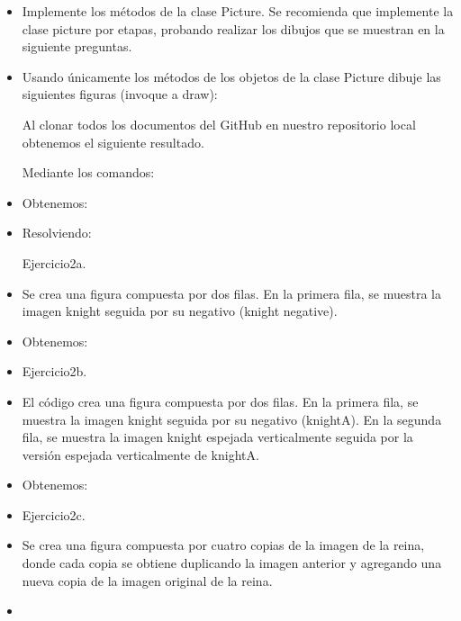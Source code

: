 \documentclass{article}
\begin{document}
\begin{itemize}
        \item Implemente los métodos de la clase Picture. Se recomienda que implemente la clase picture por etapas, probando realizar los dibujos que se muestran en la siguiente preguntas.

        \item Usando únicamente los métodos de los objetos de la clase Picture dibuje las siguientes figuras (invoque a draw):

        Al clonar todos los documentos del GitHub en nuestro repositorio local obtenemos el siguiente 
        resultado.

        Mediante los comandos:
        \item[ ]{}
        
         Obtenemos:
        \item[ ]{}

        Resolviendo: 
        
        Ejercicio2a.
        \item Se crea una figura compuesta por dos filas. En la primera fila, se muestra la imagen knight seguida por su negativo (knight negative).    
        \item[ ]{}

        Obtenemos:
        \item[ ]{}
        
        Ejercicio2b.
        \item El código crea una figura compuesta por dos filas. En la primera fila, se muestra la imagen knight seguida por su negativo (knightA). En la segunda fila, se muestra la imagen knight espejada verticalmente seguida por la versión espejada verticalmente de knightA. 
        \item[ ]{}

        Obtenemos:
        \item[ ]{}

        Ejercicio2c.
        \item Se crea una figura compuesta por cuatro copias de la imagen de la reina, donde cada copia se obtiene duplicando la imagen anterior y agregando una nueva copia de la imagen original de la reina.
        \item[ ]{}
       

\end{itemize}
\end{document}
